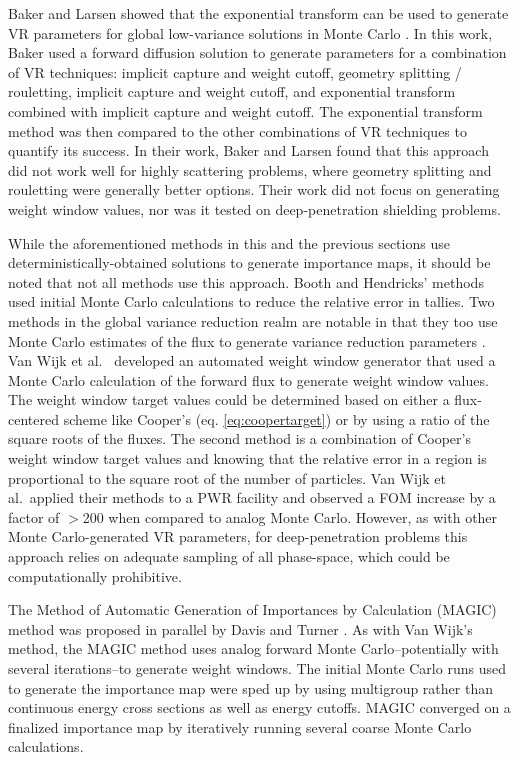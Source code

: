 Baker and Larsen showed that the exponential transform can be used to generate
VR parameters for global low-variance solutions in Monte Carlo
\cite{baker_localexponential_1993}. In this work, Baker used a forward diffusion
solution to generate parameters for a combination of VR techniques: implicit
capture and weight cutoff, geometry splitting / rouletting, implicit
capture and weight cutoff, and exponential transform combined with
implicit capture and weight cutoff. The exponential transform method was then
compared to the other combinations of VR techniques to quantify its success.
In their work, Baker and Larsen found that
this approach 
did not work well for highly scattering problems, where geometry
splitting and rouletting were generally better options. Their work did not
focus on generating weight window values, nor was it tested on deep-penetration
shielding problems.

While the aforementioned methods in this and the previous sections use
deterministically-obtained solutions to generate importance maps, it should be
noted that not all methods use this approach. Booth and Hendricks' methods used
initial Monte Carlo calculations to reduce the relative error in tallies. Two
methods in the global variance reduction realm are notable in that they too use
Monte Carlo estimates of the flux to generate variance reduction parameters
\cite{van_wijk_easy_2011, davis_comparison_2011}.
Van Wijk et al.\ \cite{van_wijk_easy_2011} developed an automated weight
window generator that used a Monte
Carlo calculation of the forward flux to generate weight window values. The
weight window target values could be determined based on either a flux-centered
scheme like Cooper's (eq. \eqref{eq:coopertarget})
or by using a ratio of the square roots of the fluxes. 
The
second method is a combination of Cooper's weight window target values and
knowing that the relative error in a region
is proportional to the square root of the number
of particles.
Van Wijk et al.\ applied their methods to a PWR facility and observed a FOM
increase by a factor of $>$200 when compared to analog Monte Carlo. However, as
with other Monte Carlo-generated VR parameters, for deep-penetration problems
this approach relies on adequate sampling of all phase-space, which could be
computationally prohibitive.

The Method of Automatic Generation of Importances by Calculation (MAGIC) method
was proposed in parallel by Davis and Turner \cite{davis_comparison_2011}.
As with Van Wijk's method, the MAGIC method uses analog forward Monte Carlo--potentially with several iterations--to generate weight windows. The initial
Monte Carlo runs used to generate the importance map were sped up by
using multigroup rather than continuous energy cross sections as well as energy cutoffs. MAGIC
converged on a finalized importance map by iteratively running several coarse
Monte Carlo calculations.

